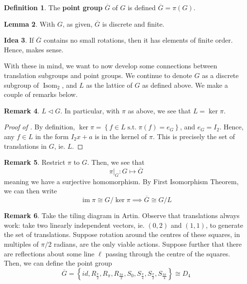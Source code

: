 \documentclass[11pt]{amsart} %
\theoremstyle{definition}
\newtheorem{definition}{Definition}[section]
\newtheorem{lemma}[definition]{Lemma}
\newtheorem{idea}[definition]{Idea}
\theoremstyle{definition}
\newtheorem{remark}[definition]{Remark}
\DeclareMathOperator{\suchthat}{\text{ s.t. }}
\DeclareMathOperator{\im}{im}
\DeclareMathOperator{\isom}{Isom}
\numberwithin{equation}{section}
\begin{document}
\begin{description}
	\begin{definition}
		The \textbf{point group} $\overline{ G}$ of $G$ is defined $\overline{ G} = \pi (G)$.
	\end{definition}
	
	\begin{lemma}
		\label{lempgisdiscretefinite}
		With $G$, as given, $\overline{ G}$ is discrete and finite.
	\end{lemma}

	\begin{idea}
		If $\overline{G}$ contains no small rotations, then it has elements of finite order. Hence,  makes sense.
	\end{idea}
\end{description}

With these in mind, we want to now develop some connections between translation subgroups and point groups. We continue to denote $G$ as a discrete subgroup of $\isom_2$, and $L $ as the lattice of $G$ as defined above. We make a couple of remarks below.

\begin{remark}
	\label{rmklatticeker}
	$L \lhd G$. In particular, with $\pi$ as above, we see that $L=\ker \pi$.
\end{remark} 

\begin{proof}[Proof of ]
	By definition, $\ker \pi = \left\{ f \in L \suchthat \pi (f) = e_{G} \right\}$, and $e_G = I_2$. Hence, any $f \in L$ in the form $I_2 x + a$ is in the kernel of $\pi$. This is precisely the set of translations in $G$, ie. $L$.
\end{proof}

\begin{remark}
	Restrict $\pi$ to $G$. Then, we see that
	$$ \pi|_{G} : G \mapsto \overline{ G} $$
	meaning we have a surjective homomorphism. By First Isomorphism Theorem, we can then write
	$$ \im \pi \cong G / \ker \pi \implies \overline{ G} \cong G / L $$
\end{remark}

\begin{remark}
	\label{obstilingexample}
	Take the tiling diagram in Artin. Observe that translations always work: take two linearly independent vectors, ie. $(0,2)$ and $(1,1)$, to generate the set of translations. Suppose rotation around the centres of these squares, in multiples of $\pi/2$ radians, are the only viable actions. Suppose further that there are reflections about some line $\ell$ passing through the centre of the squares. Then, we can define the point group
	$$ \overline{ G} =\left\{ id, R_{\frac{\pi}{2}} , R_{{\pi}} ,R_{\frac{3\pi}{2}}, S_0, S_{\frac{\pi}{4}}, S_{\frac{\pi}{2}} , S_{\frac{3\pi}{4}} \right\} \cong D_4 $$
\end{remark}
\end{document}
